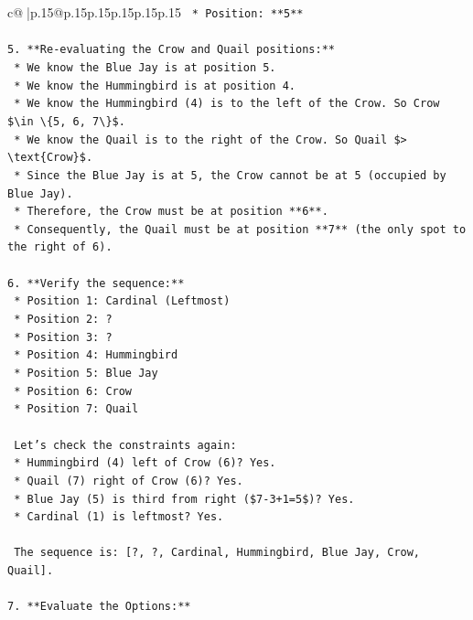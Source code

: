 \documentclass{article}
\begin{document}
{\begin{supertabular}{c@{$\;$}|p{.15\linewidth}@{}p{.15\linewidth}p{.15\linewidth}p{.15\linewidth}p{.15\linewidth}p{.15\linewidth}}
{{{\texttt{    *   Position: **5**} \\
\\ 
\texttt{5.  **Re{-}evaluating the Crow and Quail positions:**} \\
\texttt{    *   We know the Blue Jay is at position 5.} \\
\texttt{    *   We know the Hummingbird is at position 4.} \\
\texttt{    *   We know the Hummingbird (4) is to the left of the Crow. So Crow \$\textbackslash{}in \textbackslash{}\{5, 6, 7\textbackslash{}\}\$.} \\
\texttt{    *   We know the Quail is to the right of the Crow. So Quail \$> \textbackslash{}text\{Crow\}\$.} \\
\texttt{    *   Since the Blue Jay is at 5, the Crow cannot be at 5 (occupied by Blue Jay).} \\
\texttt{    *   Therefore, the Crow must be at position **6**.} \\
\texttt{    *   Consequently, the Quail must be at position **7** (the only spot to the right of 6).} \\
\\ 
\texttt{6.  **Verify the sequence:**} \\
\texttt{    *   Position 1: Cardinal (Leftmost)} \\
\texttt{    *   Position 2: ?} \\
\texttt{    *   Position 3: ?} \\
\texttt{    *   Position 4: Hummingbird} \\
\texttt{    *   Position 5: Blue Jay} \\
\texttt{    *   Position 6: Crow} \\
\texttt{    *   Position 7: Quail} \\
\\ 
\texttt{    Let's check the constraints again:} \\
\texttt{    *   Hummingbird (4) left of Crow (6)? Yes.} \\
\texttt{    *   Quail (7) right of Crow (6)? Yes.} \\
\texttt{    *   Blue Jay (5) is third from right (\$7{-}3+1=5\$)? Yes.} \\
\texttt{    *   Cardinal (1) is leftmost? Yes.} \\
\\ 
\texttt{    The sequence is: {[}?, ?, Cardinal, Hummingbird, Blue Jay, Crow, Quail{]}.} \\
\\ 
\texttt{7.  **Evaluate the Options:**} \\
}}}
\end{supertabular}}
\end{document}
